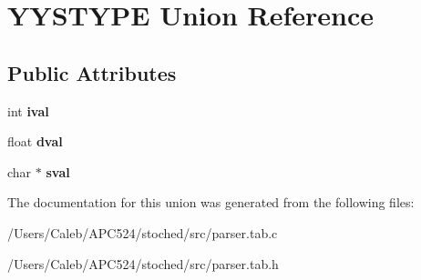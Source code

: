 \hypertarget{union_y_y_s_t_y_p_e}{}\section{Y\+Y\+S\+T\+Y\+PE Union Reference}
\label{union_y_y_s_t_y_p_e}
\subsection*{Public Attributes}
\begin{DoxyCompactItemize}
\item 
\mbox{\label{union_y_y_s_t_y_p_e_ae9d3f6cba410d8f367f34437acf8c9a2}} 
int {\bfseries ival}
\item 
\mbox{\label{union_y_y_s_t_y_p_e_aaa559352973b642b18a80a71033affe6}} 
float {\bfseries dval}
\item 
\mbox{\label{union_y_y_s_t_y_p_e_a73a5074a72319891e5442106deeb667b}} 
char $\ast$ {\bfseries sval}
\end{DoxyCompactItemize}


The documentation for this union was generated from the following files\+:\begin{DoxyCompactItemize}
\item 
/\+Users/\+Caleb/\+A\+P\+C524/stoched/src/parser.\+tab.\+c\item 
/\+Users/\+Caleb/\+A\+P\+C524/stoched/src/parser.\+tab.\+h\end{DoxyCompactItemize}
